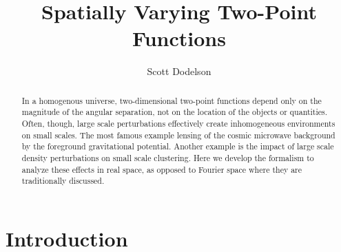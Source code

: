\documentclass[prd,amsmath,amssymb,floatfix,superscriptaddress,nofootinbib]{revtex4-1}
\begin{document}
\title{Spatially Varying Two-Point Functions}
\author{\large Scott Dodelson}
%
\begin{abstract}
In a homogenous universe, two-dimensional two-point functions depend only on the magnitude of the angular separation, not on the location of the objects or quantities. Often, though, large scale perturbations effectively create inhomogeneous environments on small scales. The most famous example lensing of the cosmic microwave background by
the foreground gravitational potential. Another example is the impact of large scale density perturbations on small scale clustering. Here we develop the formalism to analyze these effects in real space, as opposed to Fourier space where they are traditionally discussed.

\end{abstract}
\maketitle
\section{Introduction}
\end{document}
